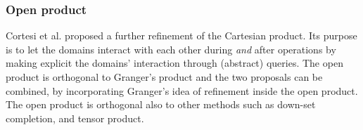 \documentclass[submission,copyright,creativecommons]{eptcs}
\begin{document}
\subsubsection{Open product}

Cortesi et al. \cite{CCH00} proposed a further refinement of the Cartesian product. Its purpose is to let the domains interact with each other during \emph{and} after operations by making explicit the domains' interaction through (abstract) queries. The open product is orthogonal to Granger's product and the two proposals can be combined, by incorporating Granger's idea of refinement inside the open product. The open product is orthogonal also to other methods such as down-set completion, and tensor product.
\end{document}

